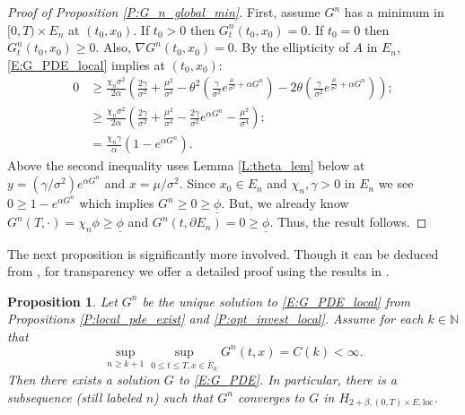 \documentclass[11pt, letterpaper]{amsart}
\newtheorem{proposition}[theorem]{Proposition}
\theoremstyle{definition}
\theoremstyle{remark}
\numberwithin{equation}{section}
\newcommand{\nats}{\mathbb N}
\newcommand{\ul}[1]{\underline{#1}}
\newcommand{\ol}[1]{\overline{#1}}
\begin{document}
\begin{proof}[Proof of Proposition \ref{P:G_n_global_min}]
First, assume $G^n$ has a minimum in $[0,T)\times E_n$ at $(t_0,x_0)$. If $t_0>0$ then $G^n_t(t_0,x_0) = 0$.  If $t_0 = 0$ then $G^n_t(t_0,x_0)\geq 0$.  Also, $\nabla G^n(t_0,x_0) = 0$.  By the ellipticity of $A$ in $E_n$, \eqref{E:G_PDE_local} implies at $(t_0,x_0)$:
\begin{equation*}
\begin{split}
0 &\geq \frac{\chi_n\sigma^2}{2\alpha}\left(\frac{2\gamma}{\sigma^2} + \frac{\mu^2}{\sigma^4} - \theta^2\left(\frac{\gamma}{\sigma^2}e^{\frac{\mu}{\sigma^2} + \alpha G^n}\right) - 2\theta\left(\frac{\gamma}{\sigma^2}e^{\frac{\mu}{\sigma^2} + \alpha G^n}\right)\right);\\
&\geq \frac{\chi_n\sigma^2}{2\alpha}\left(\frac{2\gamma}{\sigma^2} + \frac{\mu^2}{\sigma^4} - \frac{2\gamma}{\sigma^2}e^{\alpha G^n} - \frac{\mu^2}{\sigma^4}\right);\\
&=\frac{\chi_n\gamma}{\alpha}\left(1-e^{\alpha G^n}\right).
\end{split}
\end{equation*}
Above the second inequality uses Lemma \ref{L:theta_lem} below at $y=(\gamma/\sigma^2)e^{\alpha G^n}$ and $x=\mu/\sigma^2$. Since $x_0\in E_n$ and $\chi_n, \gamma > 0$ in $E_n$ we see $0 \geq 1 - e^{\alpha G^n}$ which implies $G^n \geq 0 \geq \ul{\phi}$. But, we already know $G^n(T,\cdot) = \chi_n\phi \geq \ul{\phi}$ and $G^n(t,\partial E_n) = 0 \geq \ul{\phi}$.  Thus, the result follows.

\end{proof}

The next proposition is significantly more involved. Though it can be deduced from \cite[Theorem V.8.1]{MR0241822}, for transparency we offer a detailed proof using the results in \cite{MR1465184, MR0181836}.

\begin{proposition}\label{P:G_n_bounds_give_soln}
Let $G^n$ be the unique solution to \eqref{E:G_PDE_local} from Propositions \ref{P:local_pde_exist} and \ref{P:opt_invest_local}.  Assume for each $k\in\nats$ that
\begin{equation}\label{E:G_n_loc_unif_ub}
\sup_{n\geq k+1}\sup_{0\leq t\leq T, x\in \ol{E}_k} G^n(t,x) = C(k) < \infty.
\end{equation}
Then there exists a solution $G$ to \eqref{E:G_PDE}. In particular, there is a subsequence (still labeled $n$) such that $G^n$ converges to $G$ in $H_{2+\beta,(0,T)\times E,\textrm{loc}}$.
\end{proposition}
\end{document}

